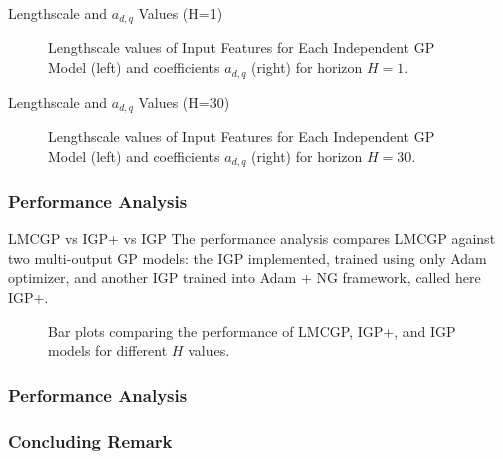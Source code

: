 \begin{frame}{Lengthscale and $a_{d,q}$ Values (H=1)}
	\begin{figure}[htbp]
		\centering
		\setlength{} 
		\setlength{}
		\subfloat[\label{fig:lmc_lengthscales}]{}\hspace{-0.8em}
		\subfloat[\label{fig:lmc_W_matrix}]{}
		\caption{Lengthscale values of Input Features for Each Independent GP Model (left) and coefficients $a_{d,q}$ (right) for horizon $H=1$.}
		\label{fig:lmc_parameters_h1} 
	\end{figure}
	
\end{frame}

\begin{frame}{Lengthscale and $a_{d,q}$ Values (H=30)}
	\begin{figure}[htbp]
		\setlength{} 
		\setlength{}
		\subfloat[\label{fig:lmc_lengthscales_h30}]{}\hspace{-0.8em}
		\subfloat[\label{fig:lmc_W_matrix_h30}]{}
		\caption{Lengthscale values of Input Features for Each Independent GP Model (left) and coefficients $a_{d,q}$ (right) for horizon $H=30$.}
		\label{fig:lmc_parameters_h30} 
	\end{figure}
\end{frame}

\subsubsection{Performance Analysis}

\begin{frame}{LMCGP vs IGP+ vs IGP}
The performance analysis compares LMCGP against two multi-output GP models: the IGP implemented, trained using only Adam optimizer, and another IGP trained into Adam + NG framework, called here IGP+.
	\begin{figure}[htbp]
		\centering
		\setlength{}
		\setlength{}
		
		\subfloat[NLPD]{}
		\hfill
		\subfloat[MSLL]{}
		
		\caption{Bar plots comparing the performance of LMCGP, IGP+, and IGP models for different \(H\) values.}
	\end{figure}
\end{frame}

\subsubsection{Performance Analysis}
\subsubsection{Concluding Remark}